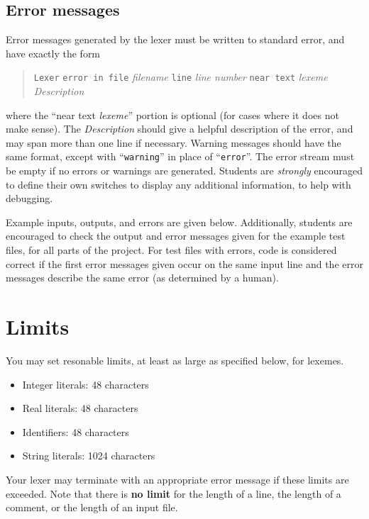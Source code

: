 \documentclass{article}
\begin{document}
\subsection{Error messages}

Error messages generated by the lexer must
be written to standard error,
and have exactly the form
\begin{quote}
	\begin{tabbing}
		{\tt Lexer} \= {\tt error in file} \emph{filename}
		{\tt line} \emph{line number}
		{\tt near text} \emph{lexeme}
	\\
		\> \emph{Description}
	\end{tabbing}
\end{quote}
where the ``near text \emph{lexeme}'' portion is optional
(for cases where it does not make sense).
The \emph{Description} should give a helpful description of the error,
and may span more than one line if necessary.
Warning messages should have the same format,
except with ``{\tt warning}'' in place of ``{\tt error}''.
The error stream must be empty if no errors or warnings are generated.
Students are \emph{strongly} encouraged to define their own switches
	to display any additional information, to help with debugging.


Example inputs, outputs, and errors are given below.
Additionally, students are encouraged to check the output and error messages
given for the example test files, for all parts of the project.
For test files with errors,
code is considered correct if the first error messages given
occur on the same input line and the error messages describe the
same error (as determined by a human).

\section{Limits}

You may set resonable limits,
at least as large as specified below, for lexemes.
\begin{itemize}
	\item Integer literals: 48 characters
	\item Real literals: 48 characters
	\item Identifiers: 48 characters
	\item String literals: 1024 characters
\end{itemize}
Your lexer may terminate with an appropriate error message
if these limits are exceeded.
Note that there is {\bf no limit} for
the length of a line,
the length of a comment,
or the length of an input file.
\end{document}
